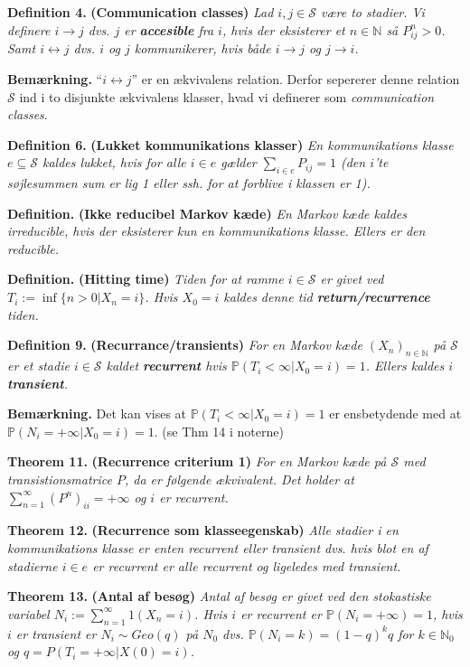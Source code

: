 \documentclass[a4paper,12pt,openany]{book}
\begin{document}
\textbf{Definition 4.} \textbf{(Communication classes)} \emph{Lad \(i,j\in\mathcal{S}\) være to stadier. Vi definere \(i\longrightarrow j\) dvs. \(j\) er \textbf{accesible} fra \(i\), hvis der eksisterer et \(n\in\mathbb{N}\) så \(P_{ij}^n>0\). Samt \(i\longleftrightarrow j\) dvs. \(i\) og \(j\) kommunikerer, hvis både \(i\longrightarrow j\) og \(j\longrightarrow i\).}

\textbf{Bemærkning.} ``\(i\longleftrightarrow j\)'' er en ækvivalens relation. Derfor sepererer denne relation \(\mathcal{S}\) ind i to disjunkte ækvivalens klasser, hvad vi definerer som \emph{communication classes}.

\textbf{Definition 6.} \textbf{(Lukket kommunikations klasser)} \emph{En kommunikations klasse \(e\subseteq \mathcal{S}\) kaldes lukket, hvis for alle \(i\in e\) gælder \(\sum_{i\in e}P_{ij}=1\) (den \(i\)'te søjlesummen sum er lig 1 eller ssh. for at forblive i klassen er 1).}

\textbf{Definition.} \textbf{(Ikke reducibel Markov kæde)} \emph{En Markov kæde kaldes irreducible, hvis der eksisterer kun en kommunikations klasse. Ellers er den reducible.}

\textbf{Definition.} \textbf{(Hitting time)} \emph{Tiden for at ramme \(i\in \mathcal{S}\) er givet ved \(T_i:=\inf\{n>0 \vert X_n=i\}\). Hvis \(X_0=i\) kaldes denne tid \textbf{return/recurrence} tiden.}

\textbf{Definition 9.} \textbf{(Recurrance/transients)} \emph{For en Markov kæde \((X_n)_{n\in\mathbb{N}}\) på \(\mathcal{S}\) er et stadie \(i\in\mathcal{S}\) kaldet \textbf{recurrent} hvis \(\mathbb{P}(T_i<\infty \vert X_0=i)=1\). Ellers kaldes \(i\) \textbf{transient}.}

\textbf{Bemærkning.} Det kan vises at \(\mathbb{P}(T_i<\infty \vert X_0=i)=1\) er ensbetydende med at \(\mathbb{P}(N_i=+\infty \vert X_0=i)=1\). (se Thm 14 i noterne)

\textbf{Theorem 11.} \textbf{(Recurrence criterium 1)} \emph{For en Markov kæde på \(\mathcal{S}\) med transistionsmatrice \(P\), da er følgende ækvivalent. Det holder at \(\sum_{n=1}^\infty (P^n)_{ii}=+\infty\) og \(i\) er recurrent.}

\textbf{Theorem 12.} \textbf{(Recurrence som klasseegenskab)} \emph{Alle stadier i en kommunikations klasse er enten recurrent eller transient dvs. hvis blot en af stadierne \(i\in e\) er recurrent er alle recurrent og ligeledes med transient.}

\textbf{Theorem 13.} \textbf{(Antal af besøg)} \emph{Antal af besøg er givet ved den stokastiske variabel \(N_i:=\sum_{n=1}^\infty 1(X_n=i)\). Hvis \(i\) er recurrent er \(\mathbb{P}(N_i=+\infty)=1\), hvis \(i\) er transient er \(N_i\sim Geo(q)\) på \(N_0\) dvs. \(\mathbb{P}(N_i=k)=(1-q)^kq\) for \(k\in\mathbb{N}_0\) og \(q=P(T_i=+\infty\vert X(0)=i)\).}
\end{document}
